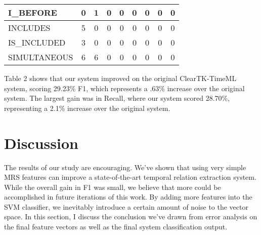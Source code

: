 \documentclass[11pt]{article}
\begin{document}
\begin{table*}[t]
{\begin{tabular}{l|c|c|c|c|c|c|c|c|}
\multicolumn{1}{|l|}{I\_BEFORE}    & 0                          & 1                           & 0                              & 0                         & 0                             & 0                             & 0                                & 0                                 \\ \hline
\multicolumn{1}{|l|}{INCLUDES}     & 5                          & 0                           & 0                              & 0                         & 0                             & 0                             & 0                                & 0                                 \\ \hline
\multicolumn{1}{|l|}{IS\_INCLUDED} & 3                          & 0                           & 0                              & 0                         & 0                             & 0                             & 0                                & 0                                 \\ \hline
\multicolumn{1}{|l|}{SIMULTANEOUS} & 6                          & 6                           & 0                              & 0                         & 0                             & 0                             & 0                                & 0                                 \\ \hline
\end{tabular}
}
\end{table*}


Table 2 shows that our system improved on the original ClearTK-TimeML system, scoring 29.23\% F1, which represents a .63\% increase over the original system. The largest gain was in Recall, where our system scored 28.70\%, representing a 2.1\% increase over the original system.

\section{Discussion}
The results of our study are encouraging. We've shown that using very simple MRS features can improve a state-of-the-art temporal relation extraction system. While the overall gain in F1 was small, we believe that more could be accomplished in future iterations of this work. By adding more features into the SVM classifier, we inevitably introduce a certain amount of noise to the vector space. In this section, I discuss the conclusion we've drawn from error analysis on the final feature vectors as well as the final system classification output.
\end{document}
